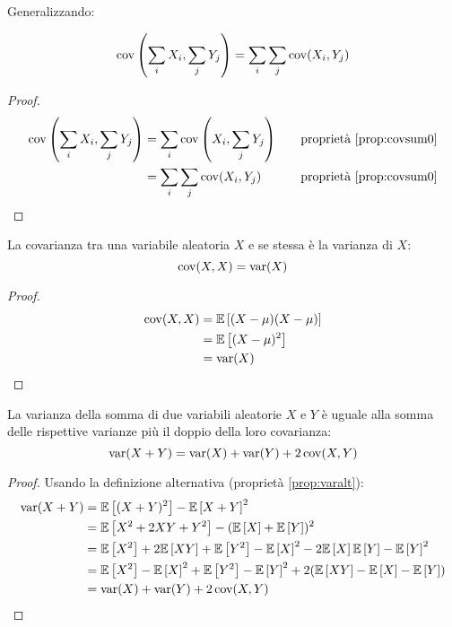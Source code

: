 Generalizzando:
\begin{prop} \label{prop:covsum}
	\begin{equation*}
		\operatorname{cov}\left(\sum_i X_i,\sum_j Y_j\right)=\sum_i\sum_j\operatorname{cov}(X_i,Y_j)
	\end{equation*}
\end{prop}
\begin{proof}
	\begin{align*}
		\operatorname{cov}\left(\sum_i X_i,\sum_j Y_j\right) & = \sum_i\operatorname{cov}\left(X_i,\sum_j Y_j\right) & \quad & \text{proprietà \ref{prop:covsum0}} \\
		                                       & = \sum_i\sum_j \operatorname{cov}(X_i,Y_j) & \quad & \text{proprietà \ref{prop:covsum0}}            \\
	\end{align*}
\end{proof}

\begin{prop}
	La covarianza tra una variabile aleatoria $X$ e se stessa è la varianza di $X$:
	\begin{equation*}
		\operatorname{cov}(X,X)=\operatorname{var}(X)
	\end{equation*}
\end{prop}
\begin{proof}
	\begin{align*}
		\operatorname{cov}(X,X) & = \mathbb{E}\left[ (X-\mu)(X-\mu) \right] \\
		          & = \mathbb{E}\left[ (X-\mu)^2 \right]      \\
		          & = \operatorname{var}(X)
	\end{align*}
\end{proof}

\begin{prop} \label{prop:varsum}
	La varianza della somma di due variabili aleatorie $X$ e $Y$ è uguale alla somma delle rispettive varianze più il doppio della loro covarianza:
	\begin{equation*}
		\operatorname{var}(X+Y) = \operatorname{var}(X)+\operatorname{var}(Y)+2\operatorname{cov}(X,Y)
	\end{equation*}
\end{prop}
\begin{proof}
	Usando la definizione alternativa (proprietà \ref{prop:varalt}):
	\begin{align*}
		\operatorname{var}(X+Y) & = \mathbb{E}\left[ (X+Y)^2 \right] - \mathbb{E}\left[ X+Y \right]^2                                            \\
		          & = \mathbb{E}\left[ X^2+2XY+Y^2 \right]-(\mathbb{E}\left[ X \right]+\mathbb{E}\left[ Y \right])^2                                   \\
		          & = \mathbb{E}\left[ X^2 \right] + 2\mathbb{E}\left[ XY \right] + \mathbb{E}\left[ Y^2 \right] - \mathbb{E}\left[ X \right]^2 - 2\mathbb{E}\left[ X \right]\mathbb{E}\left[ Y \right] - \mathbb{E}\left[ Y \right]^2 \\
		          & = \mathbb{E}\left[ X^2 \right] - \mathbb{E}\left[ X \right]^2 + \mathbb{E}\left[ Y^2 \right] - \mathbb{E}\left[ Y \right]^2 + 2(\mathbb{E}\left[ XY \right]-\mathbb{E}\left[ X \right]-\mathbb{E}\left[ Y \right]) \\
		          & = \operatorname{var}(X) + \operatorname{var}(Y) + 2\operatorname{cov}(X,Y)
	\end{align*}
\end{proof}

